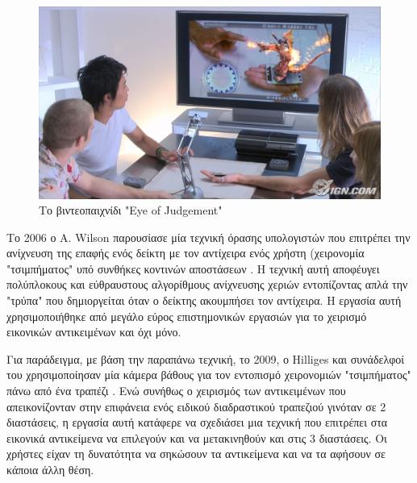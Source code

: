 \begin{figure}[H]
    \centering
    \includegraphics[scale=0.2, angle=0]{Files/Figures/eyejudgment.jpg}
    \caption[Το βιντεοπαιχνίδι "Eye of Judgement"]{Το βιντεοπαιχνίδι "Eye of Judgement"}
    \label{fig:ps3game}
\end{figure}










Το 2006 ο A. Wilson παρουσίασε μία τεχνική όρασης υπολογιστών που επιτρέπει την ανίχνευση της επαφής ενός δείκτη με τον αντίχειρα ενός χρήστη (χειρονομία "τσιμπήματος" υπό συνθήκες κοντινών αποστάσεων \cite{Wilson2006}. Η τεχνική αυτή αποφέυγει πολύπλοκους και εύθραυστους αλγορίθμους ανίχνευσης χεριών εντοπίζοντας απλά την "τρύπα" που δημιοργείται όταν ο δείκτης ακουμπήσει τον αντίχειρα. Η εργασία αυτή χρησιμοποιήθηκε από μεγάλο εύρος επιστημονικών εργασιών για το χειρισμό εικονικών αντικειμένων και όχι μόνο.



Για παράδειγμα, με βάση την παραπάνω τεχνική, το 2009, ο Hilliges και συνάδελφοί του χρησιμοποίησαν μία κάμερα βάθους για τον εντοπισμό χειρονομιών "τσιμπήματος" πάνω από ένα τραπέζι \cite{Wilson2}. Ενώ συνήθως ο χειρισμός των αντικειμένων που απεικονίζονταν στην επιφάνεια ενός ειδικού διαδραστικού τραπεζιού γινόταν σε 2 διαστάσεις, η εργασία αυτή κατάφερε να σχεδιάσει μια τεχνική που επιτρέπει στα εικονικά αντικείμενα να επιλεγούν και να μετακινηθούν και στις 3 διαστάσεις. Οι χρήστες είχαν τη δυνατότητα να σηκώσουν τα αντικείμενα και να τα αφήσουν σε κάποια άλλη θέση.




